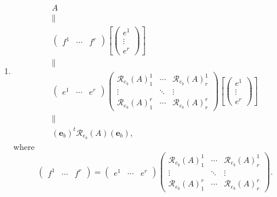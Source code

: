 \documentclass[aps,preprint]{revtex4}
\begin{document}
\begin{enumerate}
\begin{enumerate}
\item 
\begin{gather}
A \\
\parallel \\
\left( 
\begin{array}{ccc}
f^{1} & \cdots & f^{r}%
\end{array}%
\right) \left[ \left( 
\begin{array}{c}
e^{1} \\ 
\vdots \\ 
e^{r}%
\end{array}%
\right) \right] \\
\parallel \\
\left( 
\begin{array}{ccc}
e^{1} & \cdots & e^{r}%
\end{array}%
\right) \left( 
\begin{array}{ccc}
\mathcal{R}_{e_{b}}\left( A\right) _{1}^{1} & \cdots & \mathcal{R}%
_{e_{b}}\left( A\right) _{r}^{1} \\ 
\vdots & \ddots & \vdots \\ 
\mathcal{R}_{e_{b}}\left( A\right) _{1}^{r} & \cdots & \mathcal{R}%
_{e_{b}}\left( A\right) _{r}^{r}%
\end{array}%
\right) \left[ \left( 
\begin{array}{c}
e^{1} \\ 
\vdots \\ 
e^{r}%
\end{array}%
\right) \right] \\
\parallel \\
\left( \boldsymbol{e}_{b}\right) ^{t}\mathcal{R}_{e_{b}}\left( A\right)
\left( \boldsymbol{e}_{b}\right) ,
\end{gather}%
where 
\begin{equation}
\left( 
\begin{array}{ccc}
f^{1} & \cdots & f^{r}%
\end{array}%
\right) =\left( 
\begin{array}{ccc}
e^{1} & \cdots & e^{r}%
\end{array}%
\right) \left( 
\begin{array}{ccc}
\mathcal{R}_{e_{b}}\left( A\right) _{1}^{1} & \cdots & \mathcal{R}%
_{e_{b}}\left( A\right) _{r}^{1} \\ 
\vdots & \ddots & \vdots \\ 
\mathcal{R}_{e_{b}}\left( A\right) _{1}^{r} & \cdots & \mathcal{R}%
_{e_{b}}\left( A\right) _{r}^{r}%
\end{array}%
\right) .
\end{equation}


\end{enumerate}
\end{enumerate}
\end{document}
